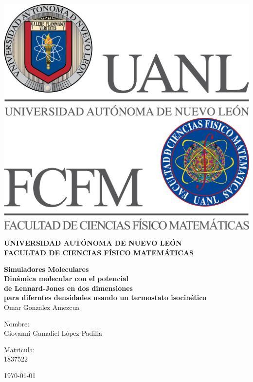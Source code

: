 \documentclass[reprint,amsmath,amssymb,aps,]{revtex4-2}
\begin{document}
\begin{titlepage}
\begin{center}
\includegraphics[scale=0.40]{../../../Logos/uanl.png} 
\hspace{2.5cm}
\includegraphics[scale=0.40]{../../../Logos/fcfm.png}
\end{center}
\vspace{2cm}
\begin{center}
\textbf{
UNIVERSIDAD AUTÓNOMA DE NUEVO LEÓN\\
FACULTAD DE CIENCIAS
FÍSICO MATEMÁTICAS}\\
\vspace*{2cm}
\begin{large}
\vspace{1cm}
\textbf{Simuladores Moleculares\vspace{0.5cm}\\
Dinámica molecular con el potencial \\ de Lennard-Jones en dos dimensiones\\ para diferntes densidades usando un termostato isocinético}\\
Omar Gonzalez Amezcua\\
\end{large}
\vspace{3.5cm}
\begin{minipage}{0.6\linewidth}
\vspace{0.5cm}
\changefontsizes{14pt}
Nombre:\\
Giovanni Gamaliel López Padilla\\
\end{minipage}
\begin{minipage}{0.2\linewidth}
\changefontsizes{14pt}
Matricula:\\
1837522
\end{minipage}
\end{center}
\vspace{4cm}
\begin{flushright}
\today
\end{flushright}
\pagebreak
\end{titlepage}
\end{document}
